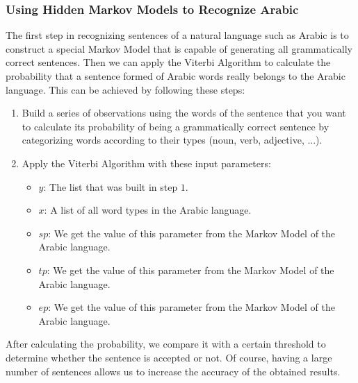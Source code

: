 \documentclass{acm_proc_article-sp}
\begin{document}
\subsubsection{Using Hidden Markov Models to Recognize Arabic}\label{Using-Hidden-Markov-Models}
The first step in recognizing sentences of a natural language such as Arabic is to construct a special Markov Model that is capable of generating all grammatically correct sentences. Then we can apply the Viterbi Algorithm to calculate the probability that a sentence formed of Arabic words really belongs to the Arabic language. This can be achieved by following these steps:
\begin{enumerate}
    \item Build a series of observations using the words of the sentence that you want to calculate its probability of being a grammatically correct sentence by categorizing words according to their types (noun, verb, adjective, ...).
    \item Apply the Viterbi Algorithm with these input parameters:
    \begin{itemize}
        \item $y$: The list that was built in step $1$.
        \item $x$: A list of all word types in the Arabic language.
        \item $sp$: We get the value of this parameter from the Markov Model of the Arabic language.
        \item $tp$: We get the value of this parameter from the Markov Model of the Arabic language.
        \item $ep$: We get the value of this parameter from the Markov Model of the Arabic language.
    \end{itemize}
\end{enumerate}
After calculating the probability, we compare it with a certain threshold to determine whether the sentence is accepted or not. Of course, having a large number of sentences allows us to increase the accuracy of the obtained results.
\end{document}

